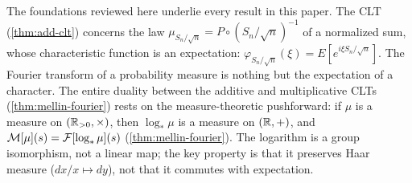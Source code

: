 \begin{remark}
The foundations reviewed here underlie every result in this paper. The CLT (\cref{thm:add-clt}) concerns the law $\mu_{S_n/\sqrt{n}} = P \circ (S_n/\sqrt{n})^{-1}$ of a normalized sum, whose characteristic function is an expectation: $\varphi_{S_n/\sqrt{n}}(\xi) = E[e^{i\xi S_n/\sqrt{n}}]$. The Fourier transform of a probability measure is nothing but the expectation of a character. The entire duality between the additive and multiplicative CLTs (\cref{thm:mellin-fourier}) rests on the measure-theoretic pushforward: if $\mu$ is a measure on $(\mathbb{R}_{>0}, \times)$, then $\log_*\mu$ is a measure on $(\mathbb{R}, +)$, and $\mathcal{M}[\mu](s) = \mathcal{F}[\log_*\mu](s)$ (\cref{thm:mellin-fourier}). The logarithm is a group isomorphism, not a linear map; the key property is that it preserves Haar measure ($dx/x \mapsto dy$), not that it commutes with expectation.
\end{remark}

